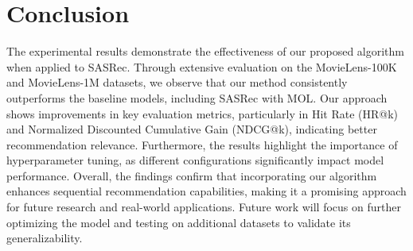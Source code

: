 \section{Conclusion}

The experimental results demonstrate the effectiveness of our proposed algorithm when applied to SASRec. Through extensive evaluation on the MovieLens-100K and MovieLens-1M datasets, we observe that our method consistently outperforms the baseline models, including SASRec with MOL. Our approach shows improvements in key evaluation metrics, particularly in Hit Rate (HR@k) and Normalized Discounted Cumulative Gain (NDCG@k), indicating better recommendation relevance. Furthermore, the results highlight the importance of hyperparameter tuning, as different configurations significantly impact model performance. 
Overall, the findings confirm that incorporating our algorithm enhances sequential recommendation capabilities, making it a promising approach for future research and real-world applications. Future work will focus on further optimizing the model and testing on additional datasets to validate its generalizability.
